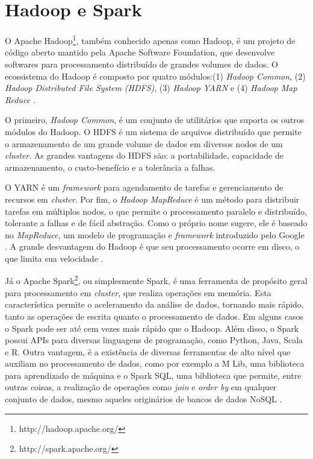 \section{Hadoop e Spark}
\label{sec:spark}

O Apache Hadoop\footnote{http://hadoop.apache.org/}, também conhecido apenas como Hadoop, 
é um projeto de código aberto mantido pela Apache Software Foundation, que desenvolve 
softwares para processamento distribuído de grandes volumes de dados. O ecossistema do 
Hadoop é composto por quatro módulos:(1) \textit{Hadoop Common}, (2) 
\textit{Hadoop Distributed File System (HDFS)}, (3) \textit{Hadoop YARN} e (4) 
\textit{Hadoop Map Reduce} \cite{kumar2014apache}. 

O primeiro, \textit{Hadoop Common}, é um conjunto de utilitários que suporta os outros módulos
do Hadoop. O HDFS é um sistema de arquivos distribuído que permite o armazenamento de um 
grande volume de dados em diversos nodos de um \textit{cluster}. As grandes vantagens do HDFS 
são: a portabilidade, capacidade de armazenamento, o custo-benefício e a tolerância a falhas. 

O YARN é um \textit{framework} para agendamento de tarefas e gerenciamento de recursos em 
\textit{cluster}. Por fim, o \textit{Hadoop MapReduce} é um método para distribuir tarefas 
em múltiplos nodos, o que permite o processamento paralelo e distribuído, tolerante a 
falhas e de fácil abstração. Como o próprio nome sugere, ele é baseado no \textit{MapReduce}, 
um modelo de programação e \textit{framework} introduzido pelo Google \cite{kumar2014apache}. 
A grande desvantagem do Hadoop é que seu processamento ocorre em disco, o que limita sua 
velocidade \cite{shoro2015big}.

Já o Apache Spark\footnote{http://spark.apache.org/}, ou simplesmente Spark, é uma ferramenta 
de propósito geral para processamento em \textit{cluster}, que realiza operações em memória. 
Esta característica permite o aceleramento da análise de dados, tornando mais rápido, 
tanto as operações de escrita quanto o processamento de dados. Em alguns casos o Spark pode ser 
até cem vezes mais rápido que o Hadoop. Além disso, o Spark possui APIs para diversas 
linguagens de programação, como Python, Java, Scala e R. Outra vantagem, é a existência de 
diversas ferramentas de alto nível que auxiliam no processamento de dados, como por exemplo 
a M Lib, uma biblioteca para aprendizado de máquina e o Spark SQL, uma biblioteca que 
permite, entre outras coisas, a realização de operações como \textit{join} e 
\textit{order by} em qualquer conjunto de dados, mesmo aqueles originários de bancos de 
dados NoSQL \cite{shoro2015big}.

